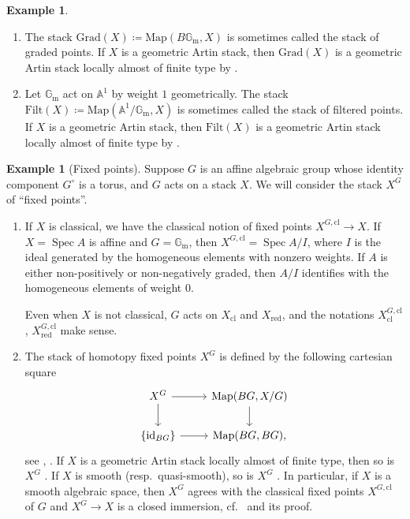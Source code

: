 \documentclass{amsart}
\theoremstyle{definition}
\newtheorem{example}[theorem]{Example}
\theoremstyle{remark}
\numberwithin{equation}{section}
\DeclareMathOperator{\Spec}{Spec}
\newcommand{\bb}{\mathbb}
\newcommand{\Gm}{{\mathbb{G}_{\mathrm{m}}}}
\newcommand{\Hom}{\mathrm{Hom}}
\newcommand{\id}{\mathrm{id}}
\newcommand{\cl}{\mathrm{cl}}
\newcommand{\Map}{\mathrm{Map}}
\newcommand{\red}{\mathrm{red}}
\begin{document}
\begin{example}
\begin{enumerate}
    In the case where $G$ is discrete and $H$ is affine, $\Hom(G, H)$ is shown to be affine in \cite[\S 3.2]{ToenDAG}; see also \cite[\S5]{GalatiusVenkatesh}, \cite[Definition 2.8, Remark 2.9, Proposition 2.10]{Zhu} and \cite[Proposition 3.1.5]{HansenMann}. 
    \item The stack $\mathrm{Grad}(X)\coloneq\Map(B{\Gm}, X)$ is sometimes called the stack of graded points. If $X$ is a geometric Artin stack, then $\mathrm{Grad}(X)$ is a geometric Artin stack locally almost of finite type by \cite[Proposition 4.3.4, Theorem 5.1.1]{HalpernLeistnerPreygel}. 
    \item Let $\Gm$ act on $\bb A^1$ by weight $1$ geometrically. The stack $\mathrm{Filt}(X)\coloneq\Map(\bb A^1 /\Gm, X)$ is sometimes called the stack of filtered points. If $X$ is a geometric Artin stack, then $\mathrm{Filt}(X)$ is a geometric Artin stack locally almost of finite type by \cite[Example 1.2.2]{HalpernLeistnerPreygel}.  
\end{enumerate}
\end{example}

\begin{example}[Fixed points]
Suppose $G$ is an affine algebraic group whose identity component $G^{\circ}$ is a torus, and $G$ acts on a stack $X$. We will consider the stack $X^G$ of ``fixed points''. 
\begin{enumerate}
    \item If $X$ is classical, we have the classical notion of fixed points $X^{G, \cl}\to X$. If $X=\Spec A$ is affine and $G=\Gm$, then $X^{G,\cl}=\Spec A/I$, where $I$ is the ideal generated by the homogeneous elements with nonzero weights. If $A$ is either non-positively or non-negatively graded, then $A/I$ identifies with the homogeneous elements of weight $0$. 
    
    Even when $X$ is not classical, $G$ acts on $X_{\cl}$ and $X_{\red}$, and the notations $X_{\cl}^{G, \cl}$, $X_{\red}^{G, \cl}$ make sense. 
    \item The stack of homotopy fixed points $X^G$ is defined by the following cartesian square
    \[
    \begin{tikzcd}
    X^G \arrow[r] \arrow[d] & \Map(BG, X/G) \arrow[d] \\
    \{\id_{BG}\} \arrow[r] & \Map (BG, BG), 
    \end{tikzcd}
    \]
    see \cite[Appendix A]{AranhaKhanLatyntsevParkRavi}, \cite[\S A.2.2]{BCHNconstructible}. If $X$ is a geometric Artin stack locally almost of finite type, then so is $X^G$ \cite[Example 4.3.5, Theorem 5.1.1]{HalpernLeistnerPreygel}. If $X$ is smooth (resp.~quasi-smooth), so is $X^G$ \cite[Corollary A.30]{AranhaKhanLatyntsevParkRavi}. In particular, if $X$ is a smooth algebraic space, then $X^G$ agrees with the classical fixed points $X^{G, \cl}$ of $G$ and $X^G\to X$ is a closed immersion, cf.~\cite[Proposition A.21]{AranhaKhanLatyntsevParkRavi} and its proof. 
\end{enumerate}
\end{example}
\end{document}
